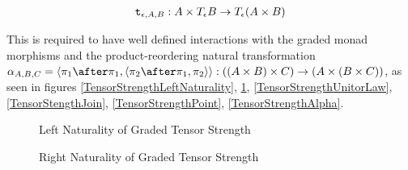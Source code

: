 \documentclass{Report}
\begin{document}
\begin{align}
    \texttt{t}_{\epsilon, A, B}: A \times T_{\epsilon}{B} \rightarrow T_{\epsilon}{(A \times B)}
\end{align}

This is required to have well defined interactions with the graded monad morphisms and the product-reordering natural transformation $\alpha_{A, B, C} = \pr{\p\after\p}{\pr{\pp\after\p}{\pp}}: ((A \times B) \times C) \rightarrow (A \times (B \times C))$, as seen in figures \ref{TensorStrengthLeftNaturality}, \ref{TensorStrengthRightNaturality}, \ref{TensorStrengthUnitorLaw}, \ref{TensorStengthJoin}, \ref{TensorStrengthPoint}, \ref{TensorStrengthAlpha}.

\begin{figure}
    \centering
    \begin{minipage}{0.45\textwidth}
        \centering
            \caption{Left Naturality of Graded Tensor Strength}
            \label{TensorStrengthLeftNaturality}
    \end{minipage}
    \hfill
    \begin{minipage}{0.45\textwidth}
        \centering
        \caption{Right Naturality of Graded Tensor Strength}
        \label{TensorStrengthRightNaturality}
    \end{minipage} 
\end{figure}
\end{document}
